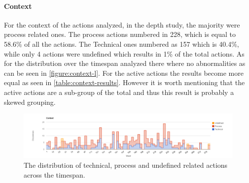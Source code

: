 \paragraph{Context}
For the context of the actions analyzed, in the depth study, the majority were process related ones. The process actions numbered in 228, which is equal to 58.6\% of all the actions. The Technical ones numbered as 157 which is 40.4\%, while only 4 actions were undefined which results in 1\% of the total actions. As for the distribution over the timespan analyzed there where no abnormalities as can be seen in \autoref{figure:context-l}. For the active actions the results become more equal as seen in \autoref{table:context-results}. However it is worth mentioning that the active actions are a sub-group of the total and thus this result is probably a skewed grouping. 

\begin{table}[!h]
	\begin{center}
	\caption{Analysis results from the content analysis for the context of the action.}
	\label{table:context-results}
	\end{center}
\end{table}

\begin{figure}
	\centering
	\includegraphics[width=\textwidth, keepaspectratio]{figures/context-l.png}
	\caption{The distribution of technical, process and undefined related actions across the timespan.}
	\label{figure:context-l}
\end{figure}
\afterpage{\clearpage}

